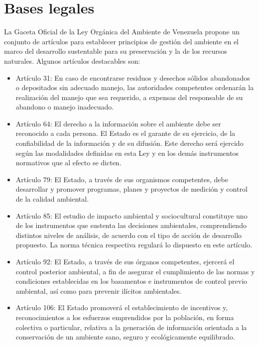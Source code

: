 \newpage

\section{Bases legales}

La Gaceta Oficial de la Ley Orgánica del Ambiente de Venezuela propone un conjunto de artículos para establecer principios de gestión del ambiente en el marco del desarrollo sustentable para su preservación y la de los recursos naturales. Algunos artículos destacables son:

\begin{itemize}
    \item Artículo 31: En caso de encontrarse residuos y desechos sólidos abandonados o depositados sin adecuado manejo, las autoridades competentes ordenarán la realización del manejo que sea requerido, a expensas del responsable de su abandono o manejo inadecuado.

    \item Artículo 64: El derecho a la información sobre el ambiente debe ser reconocido a cada persona. El Estado es el garante de su ejercicio, de la confiabilidad de la información y de su difusión. Este derecho será ejercido según las modalidades definidas en esta Ley y en los demás instrumentos normativos que al efecto se dicten.
    
    \item Artículo 79: El Estado, a través de sus organismos competentes, debe desarrollar y promover programas, planes y proyectos de medición y control de la calidad ambiental.

    \item Artículo 85: El estudio de impacto ambiental y sociocultural constituye uno de los instrumentos que sustenta las decisiones ambientales, comprendiendo distintos niveles de análisis, de acuerdo con el tipo de acción de desarrollo propuesto. La norma técnica respectiva regulará lo dispuesto en este artículo.

    \item Artículo 92: El Estado, a través de sus órganos competentes, ejercerá el control posterior ambiental, a fin de asegurar el cumplimiento de las normas y condiciones establecidas en los basamentos e instrumentos de control previo ambiental, así como para prevenir ilícitos ambientales.

    \item Artículo 106: El Estado promoverá el establecimiento de incentivos y, reconocimientos a los esfuerzos emprendidos por la población, en forma colectiva o particular, relativa a la generación de información orientada a la conservación de un ambiente sano, seguro y ecológicamente equilibrado.
\end{itemize}

